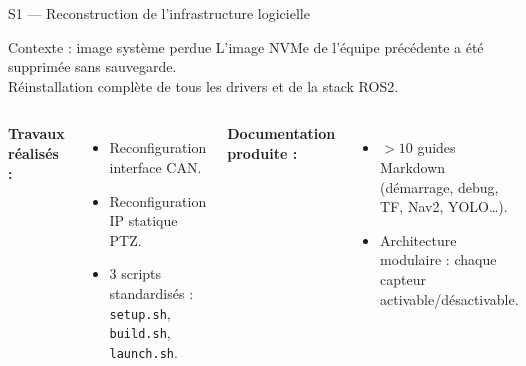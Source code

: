\documentclass[aspectratio=169]{beamer}
\begin{document}
\begin{frame}{S1 — Reconstruction de l'infrastructure logicielle}
    \begin{block}{Contexte : image système perdue}
        L'image NVMe de l'équipe précédente a été supprimée sans sauvegarde. \\ Réinstallation complète de tous les drivers et de la stack ROS2.
    \end{block}
    \vspace{0.3cm}
    \begin{columns}
        \textbf{Travaux réalisés :}
        \begin{itemize}
            \item Reconfiguration interface CAN.
            \item Reconfiguration IP statique PTZ.
            \item 3 scripts standardisés : \texttt{setup.sh}, \texttt{build.sh}, \texttt{launch.sh}.
        \end{itemize}
        \textbf{Documentation produite :}
        \begin{itemize}
            \item $>10$ guides Markdown (démarrage, debug, TF, Nav2, YOLO\dots).
            \item Architecture modulaire : chaque capteur activable/désactivable.
        \end{itemize}
    \end{columns}
\end{frame}
\end{document}
